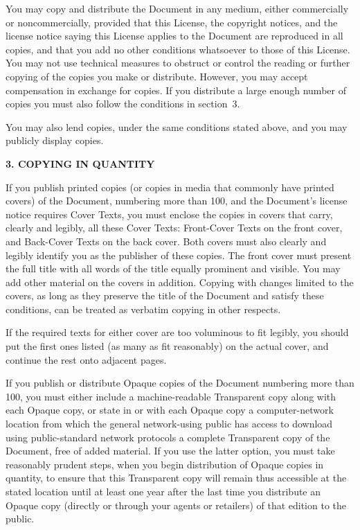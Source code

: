\documentclass[10pt,a4paper,ngerman,titlepage,tocindentauto]{article}
\begin{document}
\begin{multicols}{3}
{				You may copy and distribute the Document in any medium, either
				commercially or noncommercially, provided that this License, the
				copyright notices, and the license notice saying this License applies
				to the Document are reproduced in all copies, and that you add no other
				conditions whatsoever to those of this License.  You may not use
				technical measures to obstruct or control the reading or further
				copying of the copies you make or distribute.  However, you may accept
				compensation in exchange for copies.  If you distribute a large enough
				number of copies you must also follow the conditions in section~3.

				You may also lend copies, under the same conditions stated above, and
				you may publicly display copies.


				\begin{center}
				{\bf 3. COPYING IN QUANTITY\par}
				\end{center}

				If you publish printed copies (or copies in media that commonly have
				printed covers) of the Document, numbering more than 100, and the
				Document's license notice requires Cover Texts, you must enclose the
				copies in covers that carry, clearly and legibly, all these Cover
				Texts: Front-Cover Texts on the front cover, and Back-Cover Texts on
				the back cover.  Both covers must also clearly and legibly identify
				you as the publisher of these copies.  The front cover must present
				the full title with all words of the title equally prominent and
				visible.  You may add other material on the covers in addition.
				Copying with changes limited to the covers, as long as they preserve
				the title of the Document and satisfy these conditions, can be treated
				as verbatim copying in other respects.

				If the required texts for either cover are too voluminous to fit
				legibly, you should put the first ones listed (as many as fit
				reasonably) on the actual cover, and continue the rest onto adjacent
				pages.

				If you publish or distribute Opaque copies of the Document numbering
				more than 100, you must either include a machine-readable Transparent
				copy along with each Opaque copy, or state in or with each Opaque copy
				a computer-network location from which the general network-using
				public has access to download using public-standard network protocols
				a complete Transparent copy of the Document, free of added material.
				If you use the latter option, you must take reasonably prudent steps,
				when you begin distribution of Opaque copies in quantity, to ensure
				that this Transparent copy will remain thus accessible at the stated
				location until at least one year after the last time you distribute an
				Opaque copy (directly or through your agents or retailers) of that
				edition to the public.

}
\end{multicols}
\end{document}
